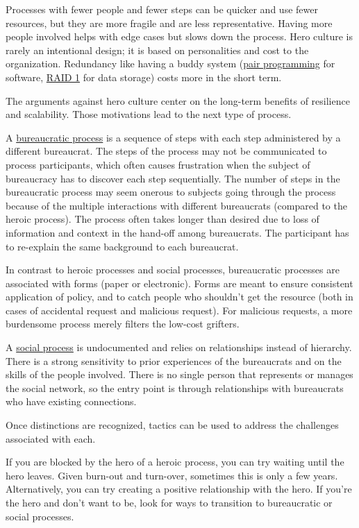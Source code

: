 Processes with fewer people and fewer steps can be quicker and use fewer resources, but they are more fragile and are less representative. Having more people involved helps with edge cases but slows down the process.  Hero culture is rarely an intentional design; it is based on personalities and cost to the organization. Redundancy like having a buddy system (\href{https://en.wikipedia.org/wiki/Pair_programming}{pair programming} for software, \href{https://en.wikipedia.org/wiki/Standard_RAID_levels#RAID_1}{RAID 1} for data storage) costs more in the short term. 

The arguments against hero culture center on the long-term benefits of resilience and scalability. Those motivations lead to the next type of process.

A \underline{bureaucratic process} is a sequence of steps with each step administered by a different bureaucrat. The steps of the process may not be communicated to process participants, which often causes frustration when the subject of bureaucracy has to discover each step sequentially. The number of steps in the bureaucratic process may seem onerous to subjects going through the process because of the multiple interactions with different bureaucrats (compared to the heroic process). The process often takes longer than desired due to loss of information and context in the hand-off among bureaucrats. The participant has to re-explain the same background to each bureaucrat.

In contrast to heroic processes and social processes, bureaucratic processes are associated with forms (paper or electronic). 
Forms are meant to ensure consistent application of policy, and to catch people who shouldn't get the resource (both in cases of accidental request and malicious request). For malicious requests, a more burdensome process merely filters the low-cost grifters. 


A \underline{social process} is undocumented and relies on relationships instead of hierarchy. There is a strong sensitivity to prior experiences of the bureaucrats and on the skills of the people involved. There is no single person that represents or manages the social network, so the entry point is through relationships with bureaucrats who have existing connections.

Once distinctions are recognized, tactics can be used to address the challenges associated with each.

If you are blocked by the hero of a heroic process, you can try waiting until the hero leaves. Given burn-out and turn-over, sometimes this is only a few years. Alternatively, you can try creating a positive relationship with the hero.  If you're the hero and don't want to be, look for ways to transition to bureaucratic or social processes. 


